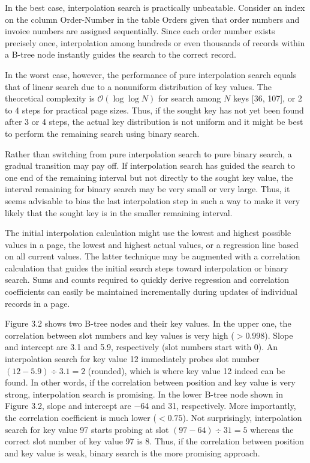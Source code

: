 In the best case, interpolation search is practically unbeatable.
Consider an index on the column Order-Number in the table Orders given
that order numbers and invoice numbers are assigned sequentially. Since
each order number exists precisely once, interpolation among hundreds or
even thousands of records within a B-tree node instantly guides the
search to the correct record.

In the worst case, however, the performance of pure interpolation search
equals that of linear search due to a nonuniform distribution of key
values. The theoretical complexity is $\mathcal{O}(\log\log N)$ for search among
$N$ keys {[}36, 107{]}, or 2 to 4 steps for practical page sizes.
Thus, if the sought key has not yet been found after 3 or 4 steps, the
actual key distribution is not uniform and it might be best to perform
the remaining search using binary search.

Rather than switching from pure interpolation search to pure binary
search, a gradual transition may pay off. If interpolation search has
guided the search to one end of the remaining interval but not directly
to the sought key value, the interval remaining for binary search may be
very small or very large. Thus, it seems advisable to bias the last
interpolation step in such a way to make it very likely that the sought
key is in the smaller remaining interval.

The initial interpolation calculation might use the lowest and highest
possible values in a page, the lowest and highest actual values, or a
regression line based on all current values. The latter technique may be
augmented with a correlation calculation that guides the initial search
steps toward interpolation or binary search. Sums and counts required to
quickly derive regression and correlation coefficients can easily be
maintained incrementally during updates of individual records in a page.

Figure 3.2 shows two B-tree nodes and their key values. In the upper
one, the correlation between slot numbers and key values is very high
($> 0.998$). Slope and intercept are 3.1 and 5.9,
respectively (slot numbers start with 0). An interpolation search for
key value 12 immediately probes slot number $(12 − 5.9) \div
3.1 = 2$ (rounded), which is where key value 12 indeed can be
found. In other words, if the correlation between position and key value
is very strong, interpolation search is promising. In the lower B-tree
node shown in Figure 3.2, slope and intercept are −64 and 31,
respectively. More importantly, the correlation coefficient is much
lower ($< 0.75$). Not surprisingly, interpolation search
for key value 97 starts probing at slot $(97 − 64) \div 31 = 5$ whereas the
correct slot number of key value 97 is 8. Thus, if the correlation
between position and key value is weak, binary search is the more
promising approach.

